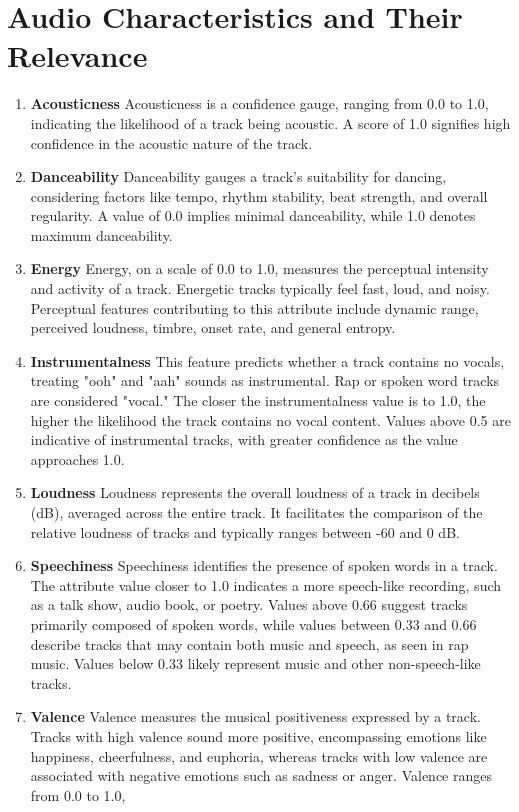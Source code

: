 \documentclass{article}
\begin{document}
\section{Audio Characteristics and Their Relevance \cite{spotifySpotifyDevelopers}}\label{F}
\begin{enumerate}
\item \textbf{Acousticness}
\newline Acousticness is a confidence gauge, ranging from 0.0 to 1.0, indicating the likelihood of a track being acoustic. A score of 1.0 signifies high confidence in the acoustic nature of the track.
\item \textbf{Danceability}
\newline Danceability gauges a track's suitability for dancing, considering factors like tempo, rhythm stability, beat strength, and overall regularity. A value of 0.0 implies minimal danceability, while 1.0 denotes maximum danceability.
\item \textbf{Energy}
\newline Energy, on a scale of 0.0 to 1.0, measures the perceptual intensity and activity of a track. Energetic tracks typically feel fast, loud, and noisy. Perceptual features contributing to this attribute include dynamic range, perceived loudness, timbre, onset rate, and general entropy.
\item \textbf{Instrumentalness}
\newline This feature predicts whether a track contains no vocals, treating "ooh" and "aah" sounds as instrumental. Rap or spoken word tracks are considered "vocal." The closer the instrumentalness value is to 1.0, the higher the likelihood the track contains no vocal content. Values above 0.5 are indicative of instrumental tracks, with greater confidence as the value approaches 1.0.
\item \textbf{Loudness}
\newline Loudness represents the overall loudness of a track in decibels (dB), averaged across the entire track. It facilitates the comparison of the relative loudness of tracks and typically ranges between -60 and 0 dB.
\item \textbf{Speechiness}
\newline Speechiness identifies the presence of spoken words in a track. The attribute value closer to 1.0 indicates a more speech-like recording, such as a talk show, audio book, or poetry. Values above 0.66 suggest tracks primarily composed of spoken words, while values between 0.33 and 0.66 describe tracks that may contain both music and speech, as seen in rap music. Values below 0.33 likely represent music and other non-speech-like tracks.
\item \textbf{Valence}
\newline Valence measures the musical positiveness expressed by a track. Tracks with high valence sound more positive, encompassing emotions like happiness, cheerfulness, and euphoria, whereas tracks with low valence are associated with negative emotions such as sadness or anger. Valence ranges from 0.0 to 1.0,
\end{enumerate}
\end{document}

